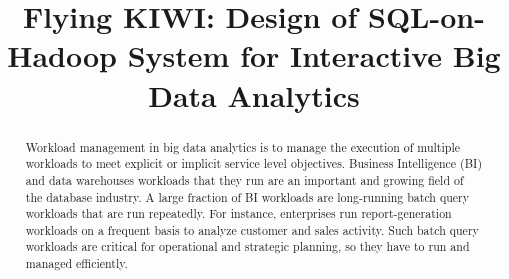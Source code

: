 \documentclass[conference]{IEEEtran}
\begin{document}
    \title{Flying KIWI: Design of SQL-on-Hadoop System for Interactive Big Data Analytics}

    \author{
 }

\maketitle

\begin{abstract}
Workload management in big data analytics is to manage the execution of multiple workloads to meet explicit or implicit service level objectives. 
Business Intelligence (BI) and data warehouses workloads that they run are an important and growing field of the database industry.
A large fraction of BI workloads are long-running batch query workloads that are run repeatedly.
For instance, enterprises run report-generation workloads on a frequent basis to analyze customer and sales activity.
Such batch query workloads are critical for operational and strategic planning, so they have to run and managed efficiently.
\end{abstract}
\end{document}
